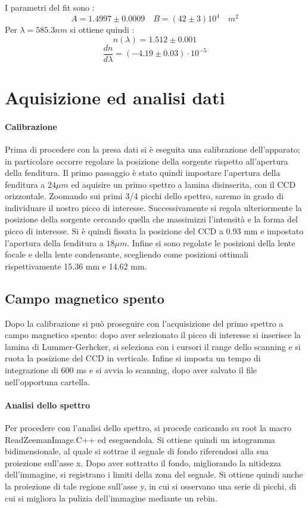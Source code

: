 \documentclass{article}
\begin{document}
I parametri del fit sono :
$$ A= 1.4997 \pm 0.0009 \quad B= (42 \pm 3 )10^4 \quad m^2$$
 Per $\lambda= 585.3 nm$ si ottiene quindi :
$$n(\lambda)= 1.512 \pm 0.001  $$
$$  \frac{dn}{d\lambda} = (-4.19 \pm 0.03 )\cdot 10^{-5} $$

\section*{Aquisizione ed analisi dati}
\paragraph{Calibrazione}
Prima di procedere con la presa dati si è eseguita una calibrazione 
dell'apparato; in particolare occorre regolare la posizione 
della sorgente rispetto all'apertura della fenditura.
Il primo passaggio è stato quindi impostare l'apertura della fenditura 
a $24 \mu m$ ed aquisire un primo spettro a lamina disinserita, con il 
CCD orizzontale. Zoomando sui primi 3/4 picchi dello spettro, saremo
in grado di individuare il nostro picco di interesse.
Successivamente si regola ulteriormente la posizione della sorgente 
cercando quella che massimizzi l'intensità e la forma del picco di 
interesse.
Si è quindi fissata la posizione del CCD a 0.93 mm e impostato l'apertura 
della fenditura a $18 \mu m$.
Infine si sono regolate le posizioni della lente focale e della lente 
condensante, scegliendo come posizioni ottimali rispettivamente 15.36 mm 
e 14.62 mm.


\subsection*{Campo magnetico spento}

Dopo la calibrazione si può proseguire con l'acquisizione del primo 
spettro a campo magnetico spento: dopo aver selezionato il picco di 
interesse si inserisce la lamina di Lummer-Gerhcker, si seleziona 
con i cursori il range dello scanning e si ruota la posizione del CCD
in verticale.
Infine si imposta un tempo di integrazione di 600 ms e si avvia lo 
scanning, dopo aver salvato il file nell'opportuna cartella.


\paragraph{Analisi dello spettro}
Per procedere con l'analisi dello spettro, si procede caricando su root la macro ReadZeemanImage.C++ ed eseguendola. Si ottiene quindi un istogramma bidimensionale, al quale si sottrae il segnale di fondo riferendosi alla sua proiezione sull’asse x.
Dopo aver sottratto il fondo, migliorando la nitidezza dell'immagine, si registrano i limiti della zona del segnale. 
Si ottiene quindi anche la proiezione di tale regione sull’asse y, in cui si osservano una serie di picchi, di cui si migliora la pulizia dell'immagine mediante un rebin.
\end{document}
